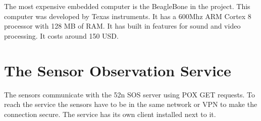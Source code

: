 The most expensive embedded computer is the BeagleBone in the project. This computer was developed by Texas instruments. It has a 600Mhz ARM Cortex 8 processor with 128 MB of RAM. It has built in features for sound and video processing. It costs around 150 USD. 

\section{The Sensor Observation Service}

The sensors communicate with the 52n SOS server using POX GET requests. To reach the service the sensors have to be in the same network or VPN to make the connection secure. The service has its own client installed next to it.
 